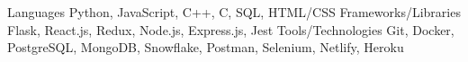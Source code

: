 
\begin{cvskills}
  \cvskill
    {Languages} %
    {Python, JavaScript, C++, C, SQL, HTML/CSS} %
  \cvskill
    {Frameworks/Libraries} %
    {Flask, React.js, Redux, Node.js, Express.js, Jest} %
  \cvskill
    {Tools/Technologies} %
    {Git, Docker, PostgreSQL, MongoDB, Snowflake, Postman, Selenium, Netlify, Heroku} %
\end{cvskills}
